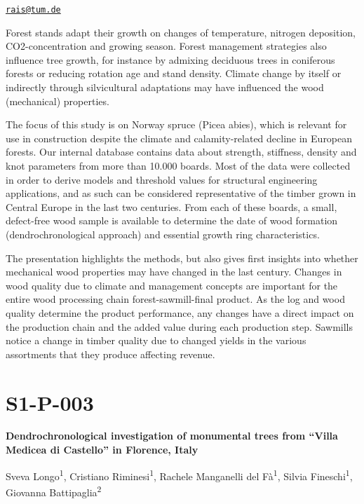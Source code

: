 \documentclass[
]{book}
\begin{document}
\href{mailto:rais@tum.de}{\nolinkurl{rais@tum.de}}

Forest stands adapt their growth on changes of temperature, nitrogen deposition, CO2-concentration and growing season. Forest management strategies also influence tree growth, for instance by admixing deciduous trees in coniferous forests or reducing rotation age and stand density. Climate change by itself or indirectly through silvicultural adaptations may have influenced the wood (mechanical) properties.

The focus of this study is on Norway spruce (Picea abies), which is relevant for use in construction despite the climate and calamity-related decline in European forests. Our internal database contains data about strength, stiffness, density and knot parameters from more than 10.000 boards. Most of the data were collected in order to derive models and threshold values for structural engineering applications, and as such can be considered representative of the timber grown in Central Europe in the last two centuries. From each of these boards, a small, defect-free wood sample is available to determine the date of wood formation (dendrochronological approach) and essential growth ring characteristics.

The presentation highlights the methods, but also gives first insights into whether mechanical wood properties may have changed in the last century. Changes in wood quality due to climate and management concepts are important for the entire wood processing chain forest-sawmill-final product. As the log and wood quality determine the product performance, any changes have a direct impact on the production chain and the added value during each production step. Sawmills notice a change in timber quality due to changed yields in the various assortments that they produce affecting revenue.

\hypertarget{s1-p-003}{%
\section*{S1-P-003}\label{s1-p-003}}

\textbf{Dendrochronological investigation of monumental trees from ``Villa Medicea di Castello'' in Florence, Italy}

Sveva Longo\textsuperscript{1}, Cristiano Riminesi\textsuperscript{1}, Rachele Manganelli del Fà\textsuperscript{1}, Silvia Fineschi\textsuperscript{1}, Giovanna Battipaglia\textsuperscript{2}
\end{document}
